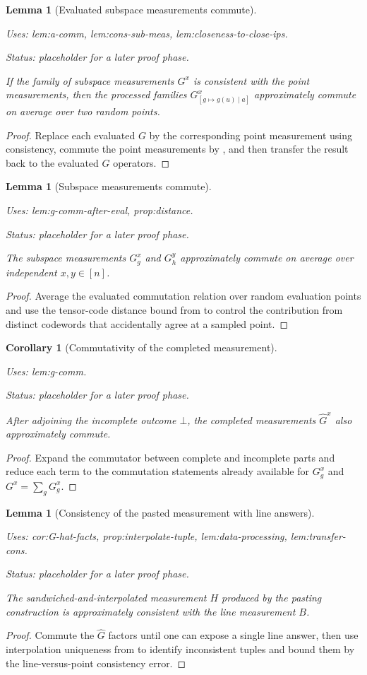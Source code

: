 \documentclass{article}
\providecommand{\uses}[1]{\par\smallskip\noindent\emph{Uses:} #1.\par\smallskip}
\providecommand{\notready}{\par\smallskip\noindent\emph{Status: placeholder for a later proof phase.}\par\smallskip}
\newtheorem{lemma}[definition]{Lemma}
\newtheorem{corollary}[definition]{Corollary}
\theoremstyle{remark}
\begin{document}
\begin{lemma}[Evaluated subspace measurements commute]\label{lem:g-comm-after-eval}
  \uses{lem:a-comm, lem:cons-sub-meas, lem:closeness-to-close-ips}
  \notready
  If the family of subspace measurements $G^x$ is consistent with the point measurements, then the processed families $G^x_{[g\mapsto g(u)\mid a]}$ approximately commute on average over two random points.
\end{lemma}
\begin{proof}
  Replace each evaluated $G$ by the corresponding point measurement using consistency, commute the point measurements by , and then transfer the result back to the evaluated $G$ operators.
\end{proof}

\begin{lemma}[Subspace measurements commute]\label{lem:g-comm}
  \uses{lem:g-comm-after-eval, prop:distance}
  \notready
  The subspace measurements $G^x_g$ and $G^y_h$ approximately commute on average over independent $x,y\in [n]$.
\end{lemma}
\begin{proof}
  Average the evaluated commutation relation over random evaluation points and use the tensor-code distance bound from  to control the contribution from distinct codewords that accidentally agree at a sampled point.
\end{proof}

\begin{corollary}[Commutativity of the completed measurement]\label{cor:G-hat-facts}
  \uses{lem:g-comm}
  \notready
  After adjoining the incomplete outcome $\bot$, the completed measurements $\widehat G^x$ also approximately commute.
\end{corollary}
\begin{proof}
  Expand the commutator between complete and incomplete parts and reduce each term to the commutation statements already available for $G^x_g$ and $G^x=\sum_g G^x_g$.
\end{proof}

\begin{lemma}[Consistency of the pasted measurement with line answers]\label{lem:h-b-consistency}
  \uses{cor:G-hat-facts, prop:interpolate-tuple, lem:data-processing, lem:transfer-cons}
  \notready
  The sandwiched-and-interpolated measurement $H$ produced by the pasting construction is approximately consistent with the line measurement $B$.
\end{lemma}
\begin{proof}
  Commute the $\widehat G$ factors until one can expose a single line answer, then use interpolation uniqueness from  to identify inconsistent tuples and bound them by the line-versus-point consistency error.
\end{proof}
\end{document}
